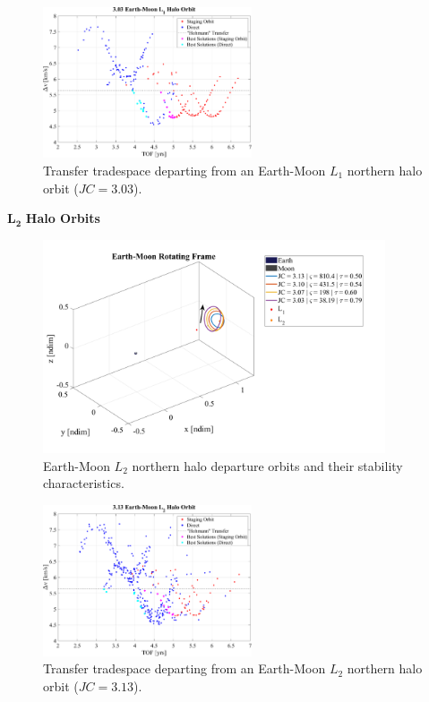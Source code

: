 \begin{figure}[ht]
    \centering
    \includegraphics[width=0.55\textwidth]{figures/TradeSpace_L1Halo_3_03.pdf}
    \caption{Transfer tradespace departing from an Earth-Moon $L_{1}$ northern halo orbit ($JC=3.03$).}
\end{figure}
\clearpage

$\pmb{L_{2}}$ \textbf{Halo Orbits}
\begin{figure}[ht]
    \centering
    \includegraphics[width=0.9\textwidth]{figures/L2HaloDepartureOrbits.pdf}
    \caption{Earth-Moon $L_{2}$ northern halo departure orbits and their stability characteristics.}
\end{figure}
\clearpage

\begin{figure}[ht]
    \centering
    \includegraphics[width=0.55\textwidth]{figures/TradeSpace_L2Halo_3_13.pdf}
    \caption{Transfer tradespace departing from an Earth-Moon $L_{2}$ northern halo orbit ($JC=3.13$).}
\end{figure}

